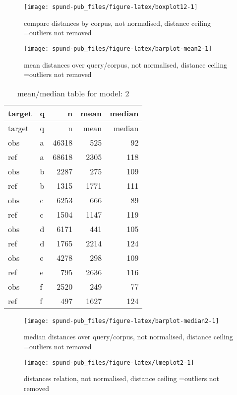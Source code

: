 \documentclass[
  12pt,
  oneside]{book}
\begin{document}
\begin{figure}[H]
\texttt{[image: spund-pub\_files/figure-latex/boxplot12-1]} \caption{compare distances by corpus, not normalised, distance ceiling =outliers not removed}\label{fig:boxplot12}
\end{figure}

\begin{figure}[H]
\texttt{[image: spund-pub\_files/figure-latex/barplot-mean2-1]} \caption{mean distances over query/corpus, not normalised, distance ceiling =outliers not removed}\label{fig:barplot-mean2}
\end{figure}

\begin{longtable}[]{@{}llrrr@{}}
\caption{\label{tab:dfe-table2}mean/median table for model: 2}\tabularnewline
\toprule\noalign{}
target & q & n & mean & median \\
\midrule\noalign{}
\endfirsthead
\toprule\noalign{}
target & q & n & mean & median \\
\midrule\noalign{}
\endhead
\bottomrule\noalign{}
\endlastfoot
obs & a & 46318 & 525 & 92 \\
ref & a & 68618 & 2305 & 118 \\
obs & b & 2287 & 275 & 109 \\
ref & b & 1315 & 1771 & 111 \\
obs & c & 6253 & 666 & 89 \\
ref & c & 1504 & 1147 & 119 \\
obs & d & 6171 & 441 & 105 \\
ref & d & 1765 & 2214 & 124 \\
obs & e & 4278 & 298 & 109 \\
ref & e & 795 & 2636 & 116 \\
obs & f & 2520 & 249 & 77 \\
ref & f & 497 & 1627 & 124 \\
\end{longtable}

\begin{figure}[H]
\texttt{[image: spund-pub\_files/figure-latex/barplot-median2-1]} \caption{median distances over query/corpus, not normalised, distance ceiling =outliers not removed}\label{fig:barplot-median2}
\end{figure}

\begin{figure}[H]
\texttt{[image: spund-pub\_files/figure-latex/lmeplot2-1]} \caption{distances relation, not normalised, distance ceiling =outliers not removed}\label{fig:lmeplot2}
\end{figure}
\end{document}
